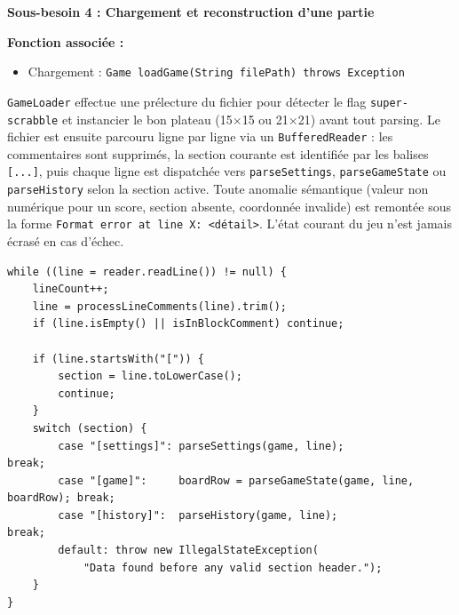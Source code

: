\documentclass[a4paper]{article}
\begin{document}
\begin{besoinbox}
    \textbf{\large Sous-besoin 4 : Chargement et reconstruction d'une partie}

    \vspace{2mm}
    \textbf{Fonction associée :}
    \begin{itemize}
        \item Chargement : \texttt{Game loadGame(String filePath) throws Exception}
    \end{itemize}
    \vspace{2mm}

    \texttt{GameLoader} effectue une prélecture du fichier pour détecter le flag \texttt{super-scrabble} et instancier le bon plateau (15$\times$15 ou 21$\times$21) avant tout parsing. Le fichier est ensuite parcouru ligne par ligne via un \texttt{BufferedReader} : les commentaires sont supprimés, la section courante est identifiée par les balises \texttt{[...]}, puis chaque ligne est dispatchée vers \texttt{parseSettings}, \texttt{parseGameState} ou \texttt{parseHistory} selon la section active. Toute anomalie sémantique (valeur non numérique pour un score, section absente, coordonnée invalide) est remontée sous la forme \texttt{Format error at line X: <détail>}. L'état courant du jeu n'est jamais écrasé en cas d'échec.

    \begin{verbatim}
while ((line = reader.readLine()) != null) {
    lineCount++;
    line = processLineComments(line).trim();
    if (line.isEmpty() || isInBlockComment) continue;

    if (line.startsWith("[")) {
        section = line.toLowerCase();
        continue;
    }
    switch (section) {
        case "[settings]": parseSettings(game, line);              break;
        case "[game]":     boardRow = parseGameState(game, line, boardRow); break;
        case "[history]":  parseHistory(game, line);               break;
        default: throw new IllegalStateException(
            "Data found before any valid section header.");
    }
}
    \end{verbatim}
\end{besoinbox}
\end{document}
